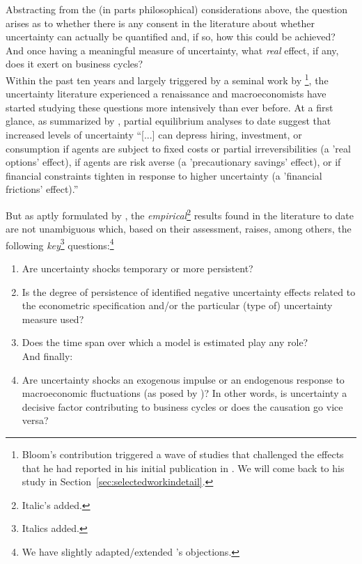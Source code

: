\documentclass[a4paper,11pt,listof=nochaptergap,oneside,pointednumbers,bibtotoc,bigheadings,liststotoc,hidelinks]{scrbook}
\theoremstyle{mysatz}
\theoremstyle{mydefinition}
\theoremstyle{mytheorem}
\theoremstyle{mybemerkung}
\begin{document}
Abstracting from the (in parts philosophical) considerations above, the question arises as to whether there is any consent in the literature about whether uncertainty can actually be quantified and, if so, how this could be achieved? And once having a meaningful measure of uncertainty, what \textit{real} effect, if any, does it exert on business cycles?\\

Within the past ten years and largely triggered by a seminal work by \citet{bloom:09}\footnote{Bloom's contribution triggered a wave of studies that challenged the effects that he had reported in his initial publication in \citet{bloom:09}. We will come back to his study in Section~\ref{sec:selectedworkindetail}.}, the uncertainty literature experienced a renaissance and macroeconomists have started studying these questions more intensively than ever before. At a first glance, as summarized by \citet[p. 1177]{juradoetal:15}, partial equilibrium analyses to date suggest that increased levels of uncertainty ``[...] can depress hiring, investment, or consumption if agents are subject to fixed costs or partial irreversibilities (a 'real options' effect), if agents are risk averse (a 'precautionary savings' effect), or if financial constraints tighten in response to higher uncertainty (a 'financial frictions' effect).''

But as aptly formulated by \citet[p. 24]{bontempietal:16}, the \textit{empirical}\footnote{Italic's added.} results found in the literature to date are not unambiguous which, based on their assessment, raises, among others, the following \textit{key}\footnote{Italics added.} questions:\footnote{We have slightly adapted/extended \citet{bontempietal:16}'s objections.}
\begin{enumerate}
	\item Are uncertainty shocks temporary or more persistent?
	\item Is the degree of persistence of identified negative uncertainty effects related to the econometric specification and/or the particular (type of) uncertainty measure used? 
	\item Does the time span over which a model is estimated play any role? \\
	And finally:
	\item Are uncertainty shocks an exogenous impulse or an endogenous response to macroeconomic fluctuations (as posed by \citealp{ludvigsonetal:19})? In other words, is uncertainty a decisive factor contributing to business cycles or does the causation go vice versa?
\end{enumerate}
\end{document}
